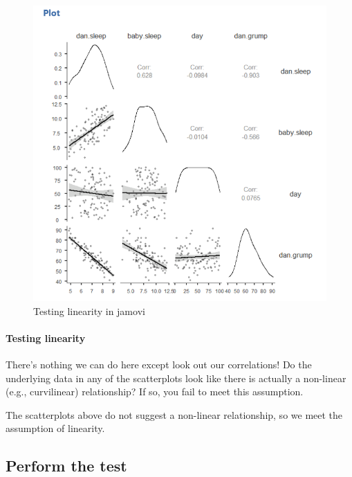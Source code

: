 \documentclass[
]{book}
\begin{document}
\begin{figure}

{\centering \includegraphics[width=1\linewidth]{images/08-correlation/correlation-plots} 

}

\caption{Testing linearity in jamovi}\label{fig:unnamed-chunk-2}
\end{figure}

\hypertarget{testing-linearity}{%
\paragraph{Testing linearity}\label{testing-linearity}}

There's nothing we can do here except look out our correlations! Do the underlying data in any of the scatterplots look like there is actually a non-linear (e.g., curvilinear) relationship? If so, you fail to meet this assumption.

The scatterplots above do not suggest a non-linear relationship, so we meet the assumption of linearity.

\hypertarget{perform-the-test-9}{%
\subsection{Perform the test}\label{perform-the-test-9}}
\end{document}

